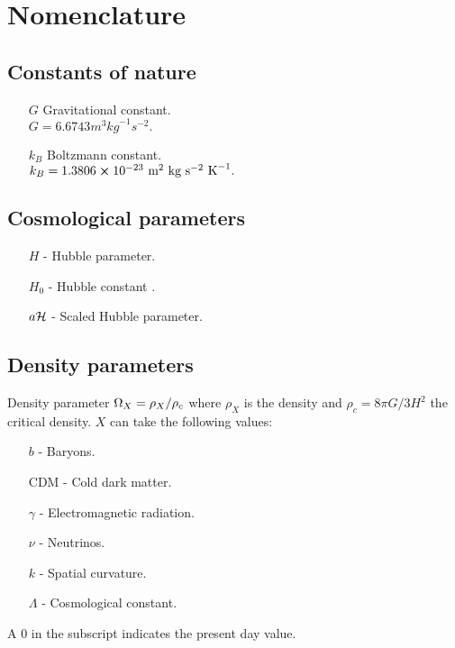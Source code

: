 \section*{Nomenclature}

\subsection*{Constants of nature}
\begin{itemize}
    \item[$G$] Gravitational constant.\\
            $G=6.6743$$\unit{m}^3\unit{kg}^{-1}\unit{s}^{-2}.$
    \item[$k_B$] Boltzmann constant.\\
            $k_B = 1.3806\cross10^{-23}\text{ {m}}^2\text{ {kg}}\text{ {s}}^{-2}\text{ {K}}^{-1}.$
\end{itemize}

\subsection*{Cosmological parameters}
\begin{itemize}
    \item[$H$] - Hubble parameter.
    \item[$H_0$] - Hubble constant .
    \item[$a\mathcal{H}$]  - Scaled Hubble parameter.
\end{itemize}

\subsection*{Density parameters}
Density parameter $\Omega_X = \rho_X/\rho_c$ where $\rho_X$ is the density and $\rho_c=8\pi G/3H^2$ the critical density. $X$ can take the following values:
\begin{itemize}
    \item[$b$] - Baryons.
    \item[CDM] - Cold dark matter.
    \item[$\gamma$] - Electromagnetic radiation.
    \item[$\nu$] - Neutrinos.
    \item[$k$] - Spatial curvature.
    \item[$\Lambda$] - Cosmological constant.
\end{itemize}
A $0$ in the subscript indicates the present day value. 